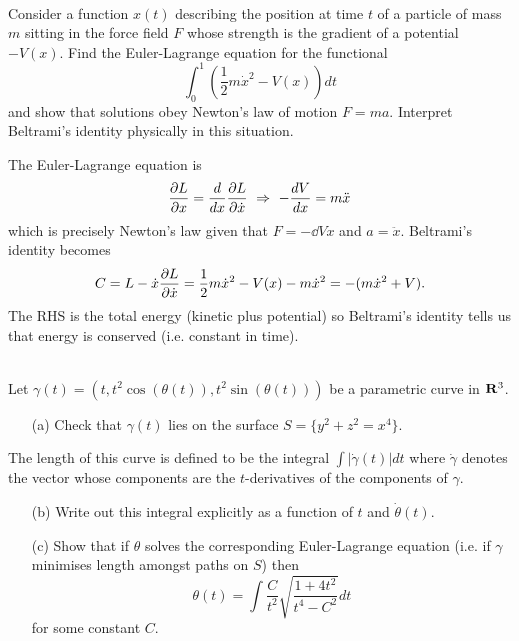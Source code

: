 \documentclass[12pt]{article}
\begin{document}
\newpage

\begin{question}\ \\
Consider a function $x(t)$ describing the position at time $t$ of a particle of mass $m$ sitting in the force field $F$ whose strength is the gradient of a potential $-V(x)$. Find the Euler-Lagrange equation for the functional
\[\int_0^1\left(\dfrac{1}{2}m\dot{x}^2-V(x)\right)dt\]
and show that solutions obey Newton's law of motion $F=ma$. Interpret Beltrami's identity physically in this situation.
\end{question}

\bigskip

\begin{answer}
The Euler-Lagrange equation is
\[\pd{L}{x}=\dd{}{x}\pd{L}{\dot{x}}\ \Rightarrow\ -\dd{V}{x}=m\ddot{x}\]
which is precisely Newton's law given that $F=-\dd{V}{x}$ and $a=\ddot{x}$. Beltrami's identity becomes
\[C=L-\dot{x}\dfrac{\partial L}{\partial \dot{x}}=\dfrac{1}{2}m\dot{x}^2-V(x)-m\dot{x}^2=-(m\dot{x}^2+V).\]
The RHS is the total energy (kinetic plus potential) so Beltrami's identity tells us that energy is conserved (i.e. constant in time).
\end{answer}
\newpage

\begin{question}\ \\
Let $\gamma(t)=(t,t^2\cos(\theta(t)),t^2\sin(\theta(t)))$ be a parametric curve in $\mathbf{R}^3$.
\begin{enumerate}
\item[(a)] Check that $\gamma(t)$ lies on the surface $S=\{y^2+z^2=x^4\}$.
\end{enumerate}
The length of this curve is defined to be the integral $\int|\dot{\gamma}(t)|dt$ where $\dot{\gamma}$ denotes the vector whose components are the $t$-derivatives of the components of $\gamma$.
\begin{enumerate}
\item[(b)] Write out this integral explicitly as a function of $t$ and $\dot{\theta}(t)$.
\item[(c)] Show that if $\theta$ solves the corresponding Euler-Lagrange equation (i.e. if $\gamma$ minimises length amongst paths on $S$) then
\[\theta(t)=\int\frac{C}{t^2}\sqrt{\frac{1+4t^2}{t^4-C^2}}dt\]
for some constant $C$.
\end{enumerate}
\end{question}
\end{document}

